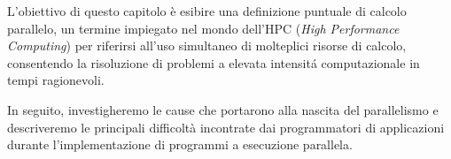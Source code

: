L'obiettivo di questo capitolo \`e esibire una definizione puntuale di calcolo parallelo, un termine impiegato nel mondo
dell'HPC (\textit{High Performance Computing}) per riferirsi all’uso simultaneo di molteplici risorse di calcolo, consentendo la risoluzione di problemi a
elevata intensit\'a computazionale in tempi ragionevoli.

In seguito, investigheremo le cause che portarono alla nascita del parallelismo e descriveremo le principali difficolt\`a incontrate dai programmatori di
applicazioni durante l'implementazione di programmi a esecuzione parallela.